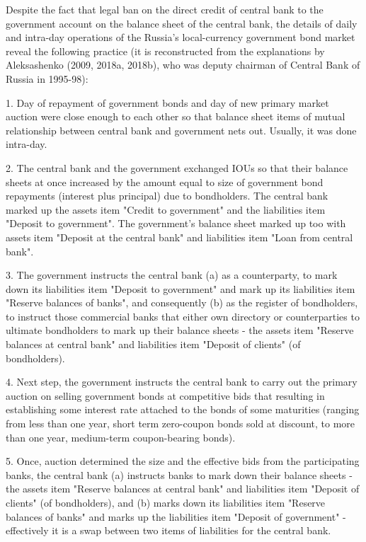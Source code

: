 Despite the fact that legal ban on the direct credit of central bank to the government account on the balance sheet of the central bank, the details of daily and intra-day operations of the Russia's local-currency government bond market reveal the following practice (it is reconstructed from the explanations by Aleksashenko (2009, 2018a, 2018b), who was deputy chairman of Central Bank of Russia in 1995-98):

1.	Day of repayment of government bonds and day of new primary market auction were close enough to each other so that balance sheet items of mutual relationship between central bank and government nets out. Usually, it was done intra-day.

2.	The central bank and the government exchanged IOUs so that their balance sheets at once increased by the amount equal to size of government bond repayments (interest plus principal) due to bondholders. The central bank marked up the assets item "Credit to government" and the liabilities item "Deposit to government". The government's balance sheet marked up too with assets item "Deposit at the central bank" and liabilities item "Loan from central bank".

3.	The government instructs the central bank (a) as a counterparty, to mark down its liabilities item "Deposit to government" and mark up its liabilities item "Reserve balances of banks", and consequently (b) as the register of bondholders, to instruct those commercial banks that either own directory or counterparties to ultimate bondholders to mark up their balance sheets - the assets item "Reserve balances at central bank" and liabilities item "Deposit of clients" (of bondholders).

4.	Next step, the government instructs the central bank to carry out the primary auction on selling government bonds at competitive bids that resulting in establishing some interest rate attached to the bonds of some maturities (ranging from less than one year, short term zero-coupon bonds sold at discount, to more than one year, medium-term coupon-bearing bonds). 

5.	Once, auction determined the size and the effective bids from the participating banks, the central bank (a) instructs banks to mark down their balance sheets - the assets item "Reserve balances at central bank" and liabilities item "Deposit of clients" (of bondholders), and (b) marks down its liabilities item "Reserve balances of banks" and marks up the liabilities item "Deposit of government" - effectively it is a swap between two items of liabilities for the central bank.

